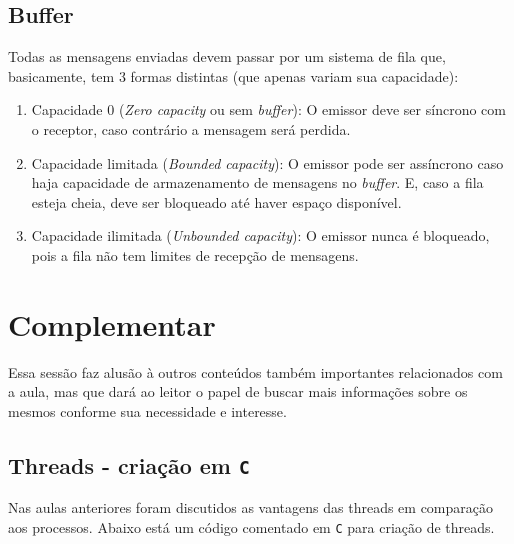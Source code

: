 \hypertarget{buffer}{%
\subsection{Buffer}\label{buffer}}

Todas as mensagens enviadas devem passar por um sistema de fila que,
basicamente, tem 3 formas distintas (que apenas variam sua capacidade):

\begin{enumerate}
\def\labelenumi{\arabic{enumi}.}
\tightlist
\item
  Capacidade 0 (\emph{Zero capacity} ou sem \emph{buffer}): O emissor
  deve ser síncrono com o receptor, caso contrário a mensagem será
  perdida.
\item
  Capacidade limitada (\emph{Bounded capacity}): O emissor pode ser
  assíncrono caso haja capacidade de armazenamento de mensagens no
  \emph{buffer}. E, caso a fila esteja cheia, deve ser bloqueado até
  haver espaço disponível.
\item
  Capacidade ilimitada (\emph{Unbounded capacity}): O emissor nunca é
  bloqueado, pois a fila não tem limites de recepção de mensagens.
\end{enumerate}

\hypertarget{complementar-1}{%
\section{Complementar}\label{complementar-1}}

Essa sessão faz alusão à outros conteúdos também importantes
relacionados com a aula, mas que dará ao leitor o papel de buscar mais
informações sobre os mesmos conforme sua necessidade e interesse.

\hypertarget{threads---criauxe7uxe3o-em-c}{%
\subsection{\texorpdfstring{Threads - criação em
\texttt{C}}{Threads - criação em C}}\label{threads---criauxe7uxe3o-em-c}}

Nas aulas anteriores foram discutidos as vantagens das threads em
comparação aos processos. Abaixo está um código comentado em \texttt{C}
para criação de threads.

